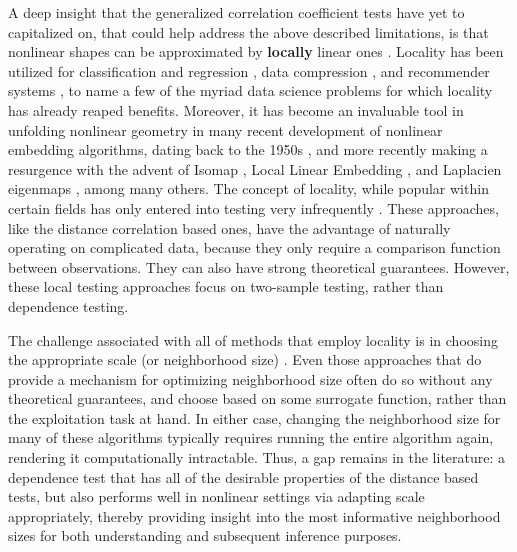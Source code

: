 \documentclass[11pt]{article}
\begin{document}
A deep insight that the generalized correlation coefficient tests  have yet to capitalized on, %
that could help address the above described limitations, 
is that nonlinear shapes can be approximated by \textbf{locally} linear ones \cite{Allard2012}.  Locality has been utilized for classification and regression  \cite{Stone1977}, data compression \cite{DaubechiesWaveletBook}, and recommender systems \cite{Sarwar2000}, to name a few of the myriad data science problems for which locality has already reaped benefits.
Moreover, it has become an invaluable tool in unfolding nonlinear geometry in many recent development of nonlinear embedding algorithms, dating back to the 1950s \cite{TorgersonBook}, and more recently making a resurgence with the advent of  Isomap \cite{TenenbaumSilvaLangford2000, SilvaTenenbaum2003}, Local Linear Embedding \cite{SaulRoweis2000, RoweisSaul2003}, and Laplacien eigenmaps \cite{BelkinNiyogi2003}, among many others. The concept of locality, while popular within certain fields has only entered into  testing very infrequently
\cite{David1966,Friedman1983,Schilling1986}.  These approaches, like the distance correlation based ones, have the advantage of naturally operating on complicated data, because they only require a comparison function between observations.  They can also have strong theoretical guarantees. 
However, these local testing approaches focus on two-sample testing, rather than dependence testing. 

The challenge associated with all of methods that employ locality is in choosing the appropriate scale (or neighborhood size) \cite{ShenVogelsteinPriebe2016}.  Even those approaches that do provide a mechanism for optimizing  neighborhood size often do so without any theoretical guarantees, and choose based on some surrogate function, rather than the exploitation task at hand. In either case, changing the neighborhood size for many of these algorithms typically requires running the entire algorithm again, rendering it computationally intractable. 
Thus, a gap remains in the literature: a dependence test that has all of the desirable properties of the distance based tests, but also performs well in nonlinear settings via adapting scale appropriately, thereby providing insight into the most informative neighborhood sizes for both understanding and subsequent inference purposes.  
\end{document}
